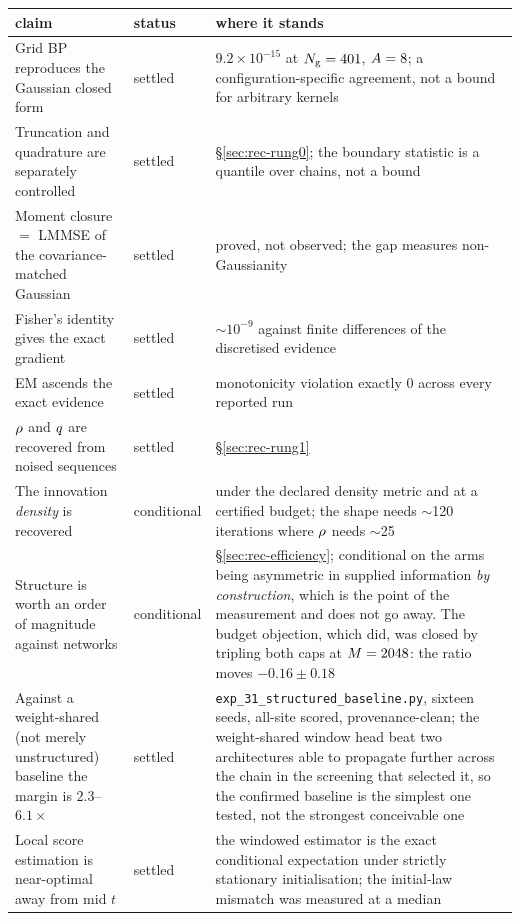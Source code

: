 {\small
\begin{longtable}{@{}p{}p{}p{}@{}}
\toprule
claim & status & where it stands \\
\midrule
Grid BP reproduces the Gaussian closed form & settled &
  $9.2\times10^{-15}$ at $N_{\mathrm{g}}=401$, $A=8$; a configuration-specific
  agreement, not a bound for arbitrary kernels \\
Truncation and quadrature are separately controlled & settled &
  \S\ref{sec:rec-rung0}; the boundary statistic is a quantile over chains, not a bound \\
Moment closure $=$ LMMSE of the covariance-matched Gaussian & settled &
  proved, not observed; the gap measures non-Gaussianity \\
Fisher's identity gives the exact gradient & settled &
  $\sim10^{-9}$ against finite differences of the discretised evidence \\
EM ascends the exact evidence & settled &
  monotonicity violation exactly $0$ across every reported run \\
$\rho$ and $q$ are recovered from noised sequences & settled &
  \S\ref{sec:rec-rung1} \\
The innovation \emph{density} is recovered & conditional &
  under the declared density metric and at a certified budget; the shape needs
  $\sim$120 iterations where $\rho$ needs $\sim$25 \\
Structure is worth an order of magnitude against networks & conditional &
  \S\ref{sec:rec-efficiency}; conditional on the arms being asymmetric in
  supplied information \emph{by construction}, which is the point of the
  measurement and does not go away. The budget objection, which did, was closed
  by tripling both caps at $M=2048$: the ratio moves $-0.16 \pm 0.18$ \\
Against a weight-shared (not merely unstructured) baseline the margin is
$2.3$--$6.1\times$ & settled &
  \texttt{exp\_31\_structured\_baseline.py}, sixteen seeds, all-site scored,
  provenance-clean; the weight-shared window head beat two architectures able
  to propagate further across the chain in the screening that selected it, so
  the confirmed baseline is the simplest one tested, not the strongest
  conceivable one \\
Local score estimation is near-optimal away from mid $t$ & settled &
  the windowed estimator is the exact conditional expectation under strictly
  stationary initialisation; the initial-law mismatch was measured at a median

\end{longtable}}
